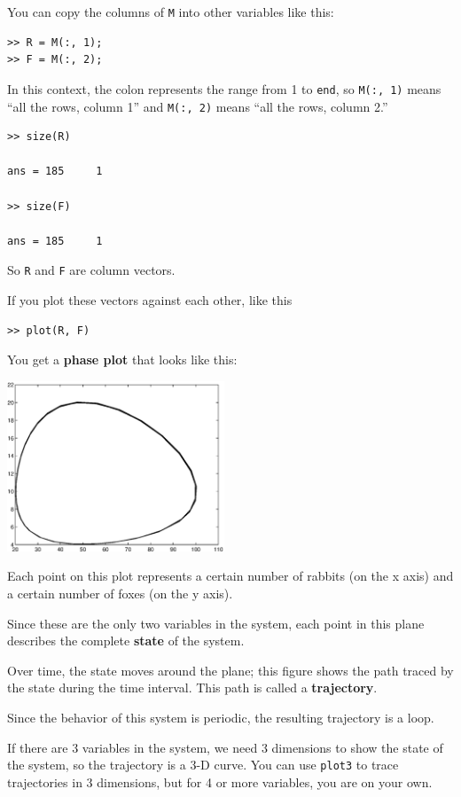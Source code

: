 \documentclass{book}
\begin{document}
You can copy the columns of {\tt M} into other variables like
this:

\begin{verbatim}
>> R = M(:, 1);
>> F = M(:, 2);
\end{verbatim}

In this context, the colon represents the range from 1 to {\tt end},
so {\tt M(:, 1)} means ``all the rows, column 1'' and
{\tt M(:, 2)} means ``all the rows, column 2.''

\begin{verbatim}
>> size(R)

ans = 185     1

>> size(F)

ans = 185     1
\end{verbatim}

So {\tt R} and {\tt F} are column vectors.


If you plot these
vectors against each other, like this

\begin{verbatim}
>> plot(R, F)
\end{verbatim}

You get a {\bf phase plot} that looks like this:

\beforefig \centerline{\includegraphics[height=2in]{figs/phase.eps}}

Each point on this plot represents a certain number of rabbits (on the
x axis) and a certain number of foxes (on the y axis).

Since these are the only two variables in the system, each point in
this plane describes the complete {\bf state} of the system.

Over time, the state moves around the plane; this figure shows
the path traced by the state during the time interval.  This path
is called a {\bf trajectory}.

Since the behavior of this system is periodic, the resulting
trajectory is a loop.

If there are 3 variables in the system, we need 3 dimensions to show
the state of the system, so the trajectory is a 3-D curve.
You can use {\tt plot3} to trace trajectories in 3 dimensions,
but for 4 or more variables, you are on your own.
\end{document}
